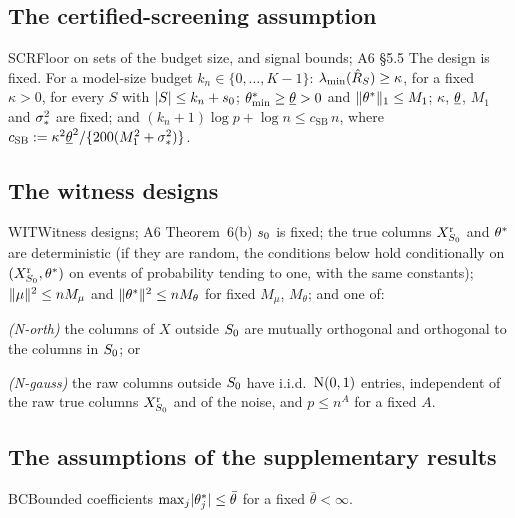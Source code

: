 \subsection{The certified-screening assumption}\label{sec:a-scr}

\begin{assumption}{SCR}{Floor on sets of the budget size, and signal bounds; A6 \S5.5}
The design is fixed. For a model-size budget $k_n\in\{0,\dots,K-1\}$: $\lambda_{\min}(\hat R_S)\ge\kappa$, for a fixed $\kappa>0$,
for every $S$ with $\lvert S\rvert\le k_n+s_0$; $\theta^*_{\min}\ge\underline\theta>0$ and $\lVert \theta^*\rVert_1\le M_1$; $\kappa$, $\underline\theta$, $M_1$ and
$\sigma_*^2$ are fixed; and $(k_n+1)\log p+\log n\le c_{\mathrm{SB}}\,n$, where
$c_{\mathrm{SB}}:=\kappa^2\underline\theta^2/\{200(M_1^2+\sigma_*^2)\}$.
\end{assumption}

\subsection{The witness designs}\label{sec:a-wit}

\begin{assumption}{WIT}{Witness designs; A6 Theorem~6(b)}
$s_0$ is fixed; the true columns $X^{\mathrm r}_{S_0}$ and $\theta^*$ are deterministic (if they are random, the conditions below hold
conditionally on $(X^{\mathrm r}_{S_0},\theta^*)$ on events of probability tending to one, with the same constants);
$\lVert \mu\rVert^2\le nM_\mu$ and $\lVert \theta^*\rVert^2\le nM_\theta$ for fixed $M_\mu$, $M_\theta$; and one of:
\begin{asmitems}
  \item\label{asm:wit-orth} \emph{(N-orth)} the columns of $X$ outside $S_0$ are mutually orthogonal and orthogonal to the
    columns in $S_0$; or
  \item\label{asm:wit-gauss} \emph{(N-gauss)} the raw columns outside $S_0$ have i.i.d.\ $\mathrm{N}(0,1)$ entries, independent
    of the raw true columns $X^{\mathrm r}_{S_0}$ and of the noise, and $p\le n^A$ for a fixed $A$.
\end{asmitems}
\end{assumption}

\subsection{The assumptions of the supplementary results}\label{sec:a-supp}

\begin{assumption}{BC}{Bounded coefficients}
$\max_{j}\lvert \theta^*_j\rvert\le\bar\theta$ for a fixed $\bar\theta<\infty$.
\end{assumption}

